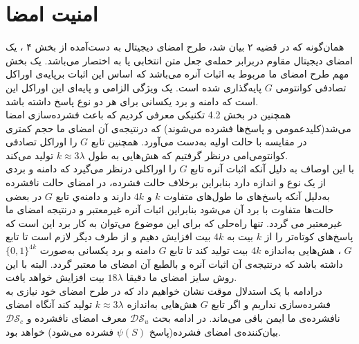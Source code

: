 \newpage
\section{امنیت امضا}\label{sign_security}

همان‌گونه که در قضیه ۲ بیان شد، طرح امضای دیجیتال به دست‌آمده از بخش ۴ ، یک امضای دیجیتال مقاوم دربرابر حمله‌ی جعل متن انتخابی یا به اختصار
 می‌باشد.
یک بخش مهم طرح امضای ما مربوط به  اثبات آنره می‌باشد که اساس این اثبات برپایه‌ی اوراکل تصادفی کوانتومی
$G$
پایه‌گذاری شده است. یک ویژگی الزامی و پایه‌ای این اوراکل این است که دامنه و برد یکسانی برای هر دو نوع پاسخ داشته باشد.
\\
 همچنین در بخش 
4.2
تکنیکی معرفی کردیم که باعث فشرده‌سازی امضا می‌شد(کلیدعمومی و پاسخ‌ها فشرده می‌شوند) که درنتیجه‌ی آن امضای ما حجم کمتری در مقایسه با حالت اولیه به‌دست می‌آورد. همچنین تابع 
$G$
را اوراکل تصادفی کوانتومی‌امی درنظر گرفتیم که هش‌هایی به طول 
$k \approx 3\lambda$
تولید می‌کند.
\\
با این اوصاف به دلیل آنکه اثبات آنره تابع 
$G$
را اوراکلی درنظر می‌گیرد که دامنه و بردی از یک نوع و اندازه دارد بنابراین برخلاف حالت فشرده، در امضای حالت نافشرده به‌دلیل آنکه پاسخ‌های ما طول‌های متفاوت 
$k$
و
$4k$
دارند و دامنه‌ي تابع 
$G$
در بعضی حالت‌ها متفاوت با برد آن می‌شود بنابراین اثبات آنره غیرمعتبر و درنتیجه امضای ما غیرمعتبر می گردد.
تنها راه‌حلی که برای این موضوع می‌توان به کار برد این است که پاسخ‌های کوتاه‌تر را از
$k$
 بیت به 
$4k$
بیت افزایش دهیم و از طرف دیگر لازم است تا تابع
$G$
، هش‌هایی به‌اندازه 
$4k$
بیت تولید کند تا تابع 
$G$
دامنه و برد یکسانی به‌صورت 
$\{ 0,1 \}^{4k}$
داشته باشد که درنتیجه‌ی آن اثبات آنره و بالطبع آن امضای ما معتبر گردد. البته با این روش  سایز امضای ما دقیقا 
$18 \lambda$
بیت افزایش خواهد یافت.
\\
درادامه با یک استدلال موقت نشان خواهیم داد که در طرح امضای خود نیازی به فشرده‌سازی نداریم  و اگر تابع 
$G$
هش‌هایی به‌اندازه 
$k \approx 3\lambda$ 
تولید کند آنگاه امضای نافشرده‌ی ما ایمن باقی می‌ماند.
 در ادامه بحث
$\mathcal{DS}_u$
معرف امضای نافشرده و
$\mathcal{DS}_c$
بیان‌کننده‌ی امضای فشرده(پاسخ
$\psi(S)$
فشرده می‌شود) خواهد بود.
\\
\label{theorem_3}

